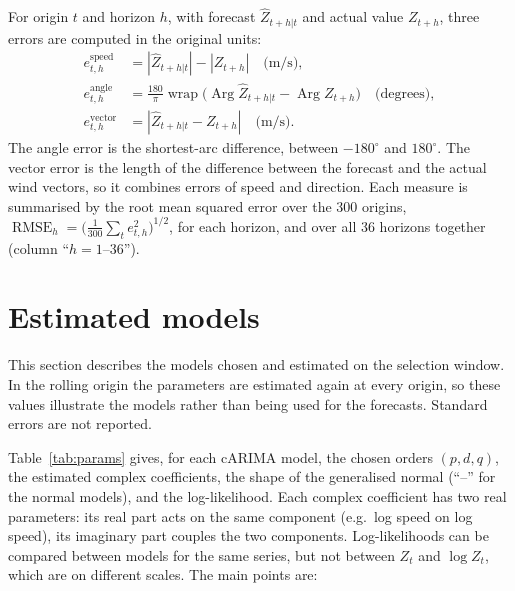 \documentclass[11pt,a4paper]{article}
\DeclareMathOperator{\Arg}{Arg}
\DeclareMathOperator{\wrap}{wrap}
\DeclareMathOperator{\RMSE}{RMSE}
\begin{document}
For origin $t$ and horizon $h$, with forecast $\hat Z_{t+h|t}$ and actual value $Z_{t+h}$, three
errors are computed in the original units:
\begin{align}
  e^{\text{speed}}_{t,h} &= |\hat Z_{t+h|t}| - |Z_{t+h}| \quad \text{(m/s)}, \\
  e^{\text{angle}}_{t,h} &= \tfrac{180}{\pi}\wrap\bigl(\Arg\hat Z_{t+h|t} - \Arg Z_{t+h}\bigr)
    \quad \text{(degrees)}, \\
  e^{\text{vector}}_{t,h} &= |\hat Z_{t+h|t} - Z_{t+h}| \quad \text{(m/s)}.
\end{align}
The angle error is the shortest-arc difference, between $-180^\circ$ and $180^\circ$. The vector
error is the length of the difference between the forecast and the actual wind vectors, so it
combines errors of speed and direction. Each measure is summarised by the root mean squared error
over the 300 origins, $\RMSE_h = \bigl(\frac{1}{300}\sum_t e_{t,h}^2\bigr)^{1/2}$, for each
horizon, and over all 36 horizons together (column ``$h = 1$--$36$'').

\section{Estimated models}\label{sec:estimates}

This section describes the models chosen and estimated on the selection window. In the rolling
origin the parameters are estimated again at every origin, so these values illustrate the models
rather than being used for the forecasts. Standard errors are not reported.

Table~\ref{tab:params} gives, for each cARIMA model, the chosen orders $(p,d,q)$, the estimated
complex coefficients, the shape of the generalised normal (``--'' for the normal models), and the
log-likelihood. Each complex coefficient has two real parameters: its real part acts on the same
component (e.g.\ log speed on log speed), its imaginary part couples the two components.
Log-likelihoods can be compared between models for the same series, but not between $Z_t$ and
$\log Z_t$, which are on different scales. The main points are:
\end{document}
